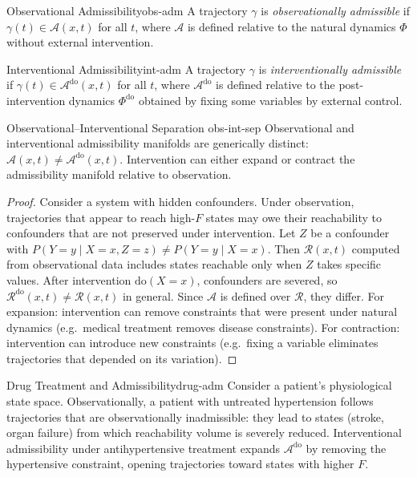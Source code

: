 \documentclass[12pt,twoside,openright]{book}
\newcommand{\bioicon}{\marginpar{\tiny\color{DistTeal}\faDna}}
\newcommand{\reach}{\mathcal{R}}
\newcommand{\adm}{\mathcal{A}}
\begin{document}
\begin{definition}{Observational Admissibility}{obs-adm}
  A trajectory $\gamma$ is \emph{observationally admissible}
  if $\gamma(t)\in\adm(x,t)$ for all $t$, where $\adm$ is
  defined relative to the natural dynamics $\Phi$ without
  external intervention.
\end{definition}

\begin{definition}{Interventional Admissibility}{int-adm}
  A trajectory $\gamma$ is \emph{interventionally
  admissible} if $\gamma(t)\in\adm^\mathrm{do}(x,t)$ for
  all $t$, where $\adm^\mathrm{do}$ is defined relative to
  the post-intervention dynamics $\Phi^\mathrm{do}$ obtained
  by fixing some variables by external control.
\end{definition}

\begin{theorem}{Observational--Interventional Separation}%
  {obs-int-sep}
  Observational and interventional admissibility manifolds
  are generically distinct: $\adm(x,t) \ne \adm^\mathrm{do}(x,t)$.
  Intervention can either expand or contract the
  admissibility manifold relative to observation.
\end{theorem}

\begin{proof}
  Consider a system with hidden confounders. Under
  observation, trajectories that appear to reach high-$F$
  states may owe their reachability to confounders that are
  not preserved under intervention. Let $Z$ be a confounder
  with $P(Y=y\mid X=x,Z=z) \ne P(Y=y\mid X=x)$. Then
  $\reach(x,t)$ computed from observational data includes
  states reachable only when $Z$ takes specific values.
  After intervention $\mathrm{do}(X=x)$, confounders are
  severed, so $\reach^\mathrm{do}(x,t) \ne \reach(x,t)$ in
  general. Since $\adm$ is defined over $\reach$, they
  differ. For expansion: intervention can remove constraints
  that were present under natural dynamics (e.g.\ medical
  treatment removes disease constraints). For contraction:
  intervention can introduce new constraints (e.g.\ fixing
  a variable eliminates trajectories that depended on its
  variation).
\end{proof}

\begin{example}{Drug Treatment and Admissibility}{drug-adm}
  \bioicon
  Consider a patient's physiological state space.
  Observationally, a patient with untreated hypertension
  follows trajectories that are observationally
  inadmissible: they lead to states (stroke, organ failure)
  from which reachability volume is severely reduced.
  Interventional admissibility under antihypertensive
  treatment expands $\adm^\mathrm{do}$ by removing the
  hypertensive constraint, opening trajectories toward
  states with higher $F$.
\end{example}
\end{document}
